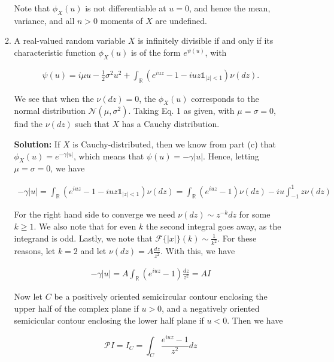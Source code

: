 \documentclass[12pt, a4paper]{article}
\begin{document}
\begin{enumerate}
\begin{enumerate}
            Note that $\phi_X(u)$ is not differentiable at $u=0$, and hence the mean, variance, and all $n>0$ moments of $X$ are undefined.

            \item A real-valued random variable $X$ is infinitely divisible if and only if its characteristic function $\phi_X(u)$ is of the form $e^{\psi(u)}$, with 
            
            \begin{align}
                \psi(u) = i\mu u - \frac{1}{2} \sigma^2 u^2 + \int_{\mathbb R} \left( e^{iuz} - 1-iuz \mathds{1}_{|z|<1} \right)\nu(dz).
            \end{align}

            We see that when the $\nu(dz)=0$, the $\phi_X(u)$ corresponds to the normal distribution $\mathcal N(\mu, \sigma^2)$. Taking Eq. 1 as given, with $\mu=\sigma=0$, find the $\nu(dz)$ such that $X$ has a Cauchy distribution.

            \textbf{Solution:} If $X$ is Cauchy-distributed, then we know from part (c) that $\phi_X(u) = e^{-\gamma |u|}$, which means that $\psi(u) = -\gamma |u|$. Hence, letting $\mu=\sigma=0$, we have

            \begin{align*}
                -\gamma |u| = \int_{\mathbb R} \left( e^{iuz} - 1-iuz \mathds{1}_{|z|<1} \right)\nu(dz) = \int_{\mathbb R}\left(e^{iuz}-1 \right) \nu(dz) - iu \int_{-1}^1 z \nu(dz)
            \end{align*}

            For the right hand side to converge we need $\nu(dz)\sim z^{-k} dz$ for some $k \ge 1$. We also note that for even $k$ the second integral goes away, as the integrand is odd. Lastly, we note that $\mathcal F\{|x|\}(k) \sim \frac{1}{k^2}$. For these reasons, let $k=2$ and let $\nu(dz)=A\frac{dz}{z^2}$. With this, we have 

            \begin{align*}
                -\gamma |u| = A \int_{\mathbb R} \left( e^{iuz} -1 \right) \frac{dz}{z^2} = AI
            \end{align*}

            Now let $C$ be a positively oriented semicircular contour enclosing the upper half of the complex plane if $u>0$, and a negatively oriented semicicular contour enclosing the lower half plane if $u<0$. Then we have 

            $$\mathcal P I = I_C = \int_C \frac{e^{iuz}-1}{z^2}dz$$


\end{enumerate}
\end{enumerate}
\end{document}
